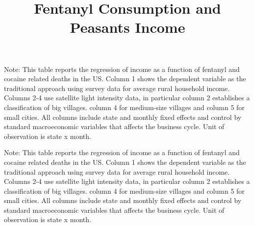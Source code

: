 \documentclass[12 pt,fullpage]{article}
\title{\textbf{Fentanyl Consumption and Peasants Income}}
\author{\vspace{-30mm}}
\theoremstyle{plain}
\begin{document}
	\date{\vspace{-25mm}}
	\maketitle
	\vspace{-15mm}



\newpage

\begin{table}[h!]
	\begin{center}
		\scalebox{0.6}{
			}
		\caption{}
	\end{center}
\end{table}
\vspace{-3mm}
\footnotesize Note: This table reports the regression of income as a function of fentanyl and cocaine related deaths in the US. Column 1 shows the dependent variable as the traditional approach using survey data for average rural household income. Columns 2-4 use satellite light intensity data, in particular column 2 establishes a classification of big villages. column 4 for medium-size villages and column 5 for small cities. All columns include state and monthly fixed effects and control by standard macroeconomic variables that affects the business cycle. Unit of observation is state x month. 


\newpage
\begin{table}[h!]
	\begin{center}
		\scalebox{0.6}{
			}
		\caption{}
	\end{center}
\end{table}
\vspace{-3mm}
\footnotesize Note: This table reports the regression of income as a function of fentanyl and cocaine related deaths in the US. Column 1 shows the dependent variable as the traditional approach using survey data for average rural household income. Columns 2-4 use satellite light intensity data, in particular column 2 establishes a classification of big villages. column 4 for medium-size villages and column 5 for small cities. All columns include state and monthly fixed effects and control by standard macroeconomic variables that affects the business cycle. Unit of observation is state x month. 
\end{document}
